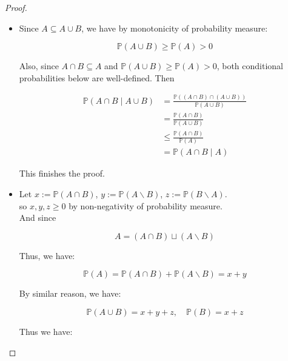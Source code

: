 \begin{proof}

\begin{itemize}
\item
  Since \(\mathit{A} \subseteq \mathit{A} \cup \mathit{B}\), we have by monotonicity of probability measure:

  \[\mathbb{P}(\mathit{A} \cup \mathit{B}) \geq \mathbb{P}(\mathit{A}) > 0\]

  Also, since \(\mathit{A} \cap \mathit{B} \subseteq \mathit{A}\) and \(\mathbb{P}(\mathit{A} \cup \mathit{B}) \geq \mathbb{P}(\mathit{A}) > 0\), both conditional probabilities below are well-defined. Then

  \[\begin{matrix}
  {\mathbb{P}(\mathit{A} \cap \mathit{B} \mid \mathit{A} \cup \mathit{B})} & {= \frac{\mathbb{P}((\mathit{A} \cap \mathit{B}) \cap (\mathit{A} \cup \mathit{B}))}{\mathbb{P}(\mathit{A} \cup \mathit{B})}} \\
   & {= \frac{\mathbb{P}(\mathit{A} \cap \mathit{B})}{\mathbb{P}(\mathit{A} \cup \mathit{B})}} \\
   & {\leq \frac{\mathbb{P}(\mathit{A} \cap \mathit{B})}{\mathbb{P}(\mathit{A})}} \\
   & {= \mathbb{P}(\mathit{A} \cap \mathit{B} \mid \mathit{A})}
  \end{matrix}\]

  This finishes the proof.
\item
  Let \(\mathit{x} := \mathbb{P}(\mathit{A} \cap \mathit{B})\), \(\mathit{y} := \mathbb{P}(\mathit{A}\backslash\mathit{B})\), \(\mathit{z} := \mathbb{P}(\mathit{B}\backslash\mathit{A})\).\\
  so \(\mathit{x},\mathit{y},\mathit{z} \geq 0\) by non-negativity of probability measure.\\
  And since

  \[\mathit{A} = (\mathit{A} \cap \mathit{B}) \sqcup (\mathit{A}\backslash\mathit{B})\]

  Thus, we have:

  \[\mathbb{P}(\mathit{A}) = \mathbb{P}(\mathit{A} \cap \mathit{B}) + \mathbb{P}(\mathit{A}\backslash\mathit{B}) = \mathit{x} + \mathit{y}\]

  By similar reason, we have:

  \[\mathbb{P}(\mathit{A} \cup \mathit{B}) = \mathit{x} + \mathit{y} + \mathit{z},\quad\mathbb{P}(\mathit{B}) = \mathit{x} + \mathit{z}\]

  Thus we have:


\end{itemize}
\end{proof}
